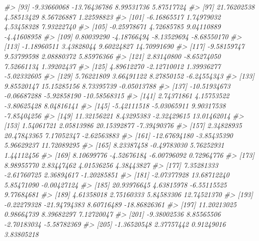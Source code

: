 \documentclass[
]{book}
\newenvironment{Shaded}{\begin{snugshade}}{\end{snugshade}}
\newcommand{\CommentTok}[1]{\textcolor[rgb]{0.56,0.35,0.01}{\textit{#1}}}
\begin{document}
\begin{Shaded}
\begin{Highlighting}[]
\CommentTok{\#\textgreater{}  [93]  {-}9.33660068 {-}13.76436786   8.99531736   5.87517724}
\CommentTok{\#\textgreater{}  [97]  21.76202538   4.58513429   8.56726887   1.22598823}
\CommentTok{\#\textgreater{} [101]  {-}6.16865517   1.74979032   4.53458328   7.93222740}
\CommentTok{\#\textgreater{} [105]  {-}0.25978671   4.72685785   9.04110889  {-}4.41608958}
\CommentTok{\#\textgreater{} [109]   0.80039290  {-}4.18766494  {-}8.13529694  {-}8.68550170}
\CommentTok{\#\textgreater{} [113]  {-}1.18960511   3.43828044   9.60224827  14.70991690}
\CommentTok{\#\textgreater{} [117]  {-}9.58159747   9.53799598   2.08880372   5.85976366}
\CommentTok{\#\textgreater{} [121]   2.83140800  {-}8.65274050   7.52661134   1.39202437}
\CommentTok{\#\textgreater{} [125]   4.89612270  {-}2.12710012   1.39936277  {-}5.02332605}
\CommentTok{\#\textgreater{} [129]   5.76221809   3.66491122   8.27850152  {-}6.24554343}
\CommentTok{\#\textgreater{} [133]   9.85520147  15.15285156   8.73395739  {-}0.05013788}
\CommentTok{\#\textgreater{} [137] {-}10.51934673  {-}0.06687288  {-}5.92858190 {-}10.58568315}
\CommentTok{\#\textgreater{} [141]   2.74371861   4.15753522  {-}3.80625428   8.04816141}
\CommentTok{\#\textgreater{} [145]  {-}5.42111518  {-}5.03065911   9.90317538  {-}7.85404256}
\CommentTok{\#\textgreater{} [149]  11.32156221   8.43295383  {-}2.32429615  13.01462014}
\CommentTok{\#\textgreater{} [153]   1.54061721   2.05813986  20.15392877  {-}7.39490376}
\CommentTok{\#\textgreater{} [157]   2.34828935  20.47843365   7.17052347  {-}2.62563883}
\CommentTok{\#\textgreater{} [161] {-}12.67694180  {-}3.85435390   5.96629237  11.72089295}
\CommentTok{\#\textgreater{} [165]   8.23387458  {-}0.49783030   5.76252931   1.44112456}
\CommentTok{\#\textgreater{} [169]   8.10699776  {-}4.52676184  {-}6.00796092   0.72964776}
\CommentTok{\#\textgreater{} [173]   8.98955770   2.83447462   4.01536256   4.38443827}
\CommentTok{\#\textgreater{} [177]   7.35281333  {-}2.61760725   2.36894617  {-}1.20285851}
\CommentTok{\#\textgreater{} [181]  {-}2.07377928  13.68712240   5.85471090  {-}0.00427124}
\CommentTok{\#\textgreater{} [185]  20.93976645   4.63815978  {-}6.55115525   9.77684681}
\CommentTok{\#\textgreater{} [189]   4.61358018   2.75160333   5.84583306  12.74521370}
\CommentTok{\#\textgreater{} [193]  {-}0.22279328 {-}21.94794383   8.60716489 {-}18.86826361}
\CommentTok{\#\textgreater{} [197]  11.20213025   0.98664739   8.39682297   7.12720047}
\CommentTok{\#\textgreater{} [201]  {-}9.38002536   8.85565506  {-}2.70183034  {-}5.58782369}
\CommentTok{\#\textgreater{} [205]  {-}1.36520548   2.37757442   0.91249016   3.83805218}

\end{Highlighting}
\end{Shaded}
\end{document}
